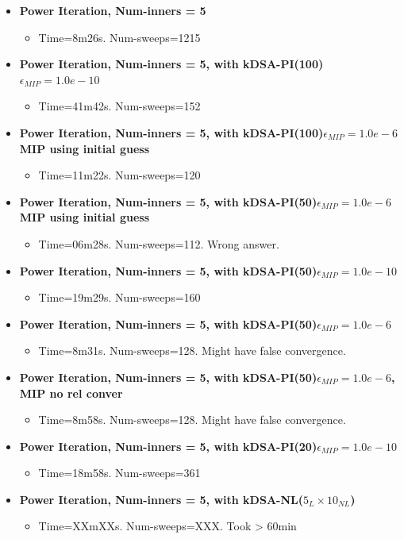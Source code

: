 \documentclass[11pt,letterpaper,notitlepage]{article}
\numberwithin{equation}{section}
\begin{document}
\begin{itemize}
\item \textbf{Power Iteration, Num-inners = 5}
\begin{itemize}
	\item Time=8m26s. Num-sweeps=1215
\end{itemize}
\item \textbf{Power Iteration, Num-inners = 5, with kDSA-PI(100)$\epsilon_{MIP}=1.0e-10$}
\begin{itemize}
	\item Time=41m42s. Num-sweeps=152
\end{itemize}
\item \textbf{Power Iteration, Num-inners = 5, with kDSA-PI(100)$\epsilon_{MIP}=1.0e-6$ MIP using initial guess}
\begin{itemize}
	\item Time=11m22s. Num-sweeps=120
\end{itemize}
\item \textbf{Power Iteration, Num-inners = 5, with kDSA-PI(50)$\epsilon_{MIP}=1.0e-6$ MIP using initial guess}
\begin{itemize}
	\item Time=06m28s. Num-sweeps=112. Wrong answer.
\end{itemize}
\item \textbf{Power Iteration, Num-inners = 5, with kDSA-PI(50)$\epsilon_{MIP}=1.0e-10$}
\begin{itemize}
	\item Time=19m29s. Num-sweeps=160
\end{itemize}
\item \textbf{Power Iteration, Num-inners = 5, with kDSA-PI(50)$\epsilon_{MIP}=1.0e-6$}
\begin{itemize}
	\item Time=8m31s. Num-sweeps=128. Might have false convergence.
\end{itemize}
\item \textbf{Power Iteration, Num-inners = 5, with kDSA-PI(50)$\epsilon_{MIP}=1.0e-6$, MIP no rel conver}
\begin{itemize}
	\item Time=8m58s. Num-sweeps=128. Might have false convergence.
\end{itemize}
\item \textbf{Power Iteration, Num-inners = 5, with kDSA-PI(20)$\epsilon_{MIP}=1.0e-10$}
\begin{itemize}
	\item Time=18m58s. Num-sweeps=361
\end{itemize}
\item \textbf{Power Iteration, Num-inners = 5, with kDSA-NL($5_{L}\times 10_{NL}$)}
\begin{itemize}
	\item Time=XXmXXs. Num-sweeps=XXX. Took > 60min
\end{itemize}
\end{itemize}
\end{document}
